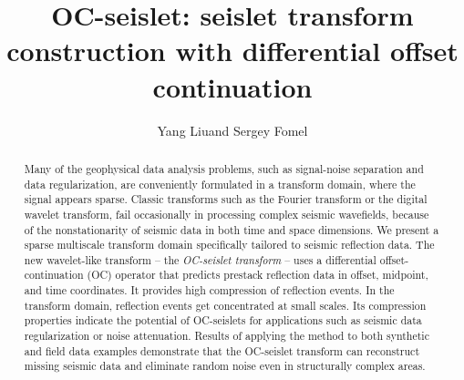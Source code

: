 \title{OC-seislet: seislet transform construction with differential offset continuation}

\renewcommand{\thefootnote}{\fnsymbol{footnote}}


\address{
\footnotemark[1] College of Geo-exploration Science and Technology,\\
Jilin University \\
No.6 Xi minzhu street, \\
Changchun, China, 130026 \\
\footnotemark[2] Bureau of Economic Geology,\\
John A. and Katherine G. Jackson School of Geosciences \\
The University of Texas at Austin \\
University Station, Box X \\
Austin, TX, USA, 78713-8924}

\author{Yang Liu\footnotemark[1]\footnotemark[2] and Sergey Fomel\footnotemark[2]}

\maketitle

\begin{abstract}

 Many of the geophysical data analysis problems, such as signal-noise
 separation and data regularization, are conveniently formulated in a
 transform domain, where the signal appears sparse. Classic transforms
 such as the Fourier transform or the digital wavelet transform, fail
 occasionally in processing complex seismic wavefields, because of the
 nonstationarity of seismic data in both time and space dimensions. We
 present a sparse multiscale transform domain specifically tailored to
 seismic reflection data. The new wavelet-like transform -- the
 \emph{OC-seislet transform} -- uses a differential
 offset-continuation (OC) operator that predicts prestack reflection
 data in offset, midpoint, and time coordinates. It provides high
 compression of reflection events. In the transform domain, reflection
 events get concentrated at small scales. Its compression properties
 indicate the potential of OC-seislets for applications such as
 seismic data regularization or noise attenuation. Results of applying
 the method to both synthetic and field data examples demonstrate that
 the OC-seislet transform can reconstruct missing seismic data and
 eliminate random noise even in structurally complex areas.
\end{abstract}

